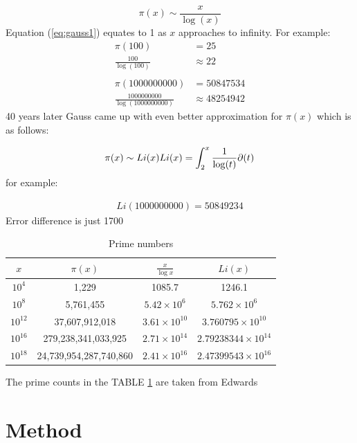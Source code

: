 \documentclass[conference]{IEEEtran}
\begin{document}
	\begin{equation}
		\pi(x)\sim \frac{x}{\log(x)}
	\end{equation}
Equation (\ref{eq:gauss1}) equates to 1 as $x$ approaches to infinity. For example: 
	\begin{align*}
			\pi(100) &= 25 \\
			\frac{100}{\log(100)} &\approx 22 \\\\
			\pi(1000000000) &= 50847534 \\
			\frac{1000000000}{\log(1000000000)} &\approx 48254942
		\end{align*}
40 years later Gauss came up with even better approximation for $\pi(x)$ which is as follows:

	\begin{equation}
		\pi(x) \sim Li(x)\\
		Li(x)=\int_2^x\frac{1}{\log(t)}\partial(t)
	\end{equation}
for example:

\begin{align*}
		Li(1000000000) = 50849234
	\end{align*}
Error difference is just 1700

\begin{table}[ht]
	\begin{center}
	\begin{tabular}{|c|c|c|c|}
    	\hline
       		$x$	&		$\pi(x)$					&	$\frac{x}{\log x}$		&	$Li(x)$\\
	\hline
    		$10^{4}$	&	1,229					&	1085.7				&	1246.1	\\
		$10^{8}$	&	5,761,455					&	$5.42 \times 10^6$		&	$5.762 \times 10^6$	\\
		$10^{12}$	&	37,607,912,018				&	$3.61 \times 10^10$		&	$3.760795  \times 10^10$		\\
		$10^{16}$	&	279,238,341,033,925		&	$2.71 \times 10^14$		&	$2.79238344 \times 10^14$	\\
		$10^{18}$	&	24,739,954,287,740,860		&	$2.41 \times 10^16$		&	$2.47399543 \times 10^16$	\\
	\hline
	\end{tabular}
	\end{center}
	\caption{Prime numbers}
	\label{table:gauss_values}

\end{table}
The prime counts in the TABLE \ref{table:gauss_values} are taken from Edwards\cite{zeta_values}

\section{{\LARGE Method}}
\end{document}

